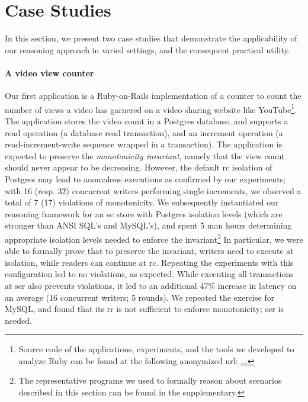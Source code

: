 \section{Case Studies}
\label{sec:case-studies}

In this section, we present two case studies that demonstrate the
applicability of our reasoning approach in varied settings, and the
consequent practical utility.

\paragraph{A video view counter} Our first application is a
Ruby-on-Rails implementation of a counter to count the number of views
a video has garnered on a video-sharing website like
YouTube\footnote{Source code of the applications, experiments, and the
tools we developed to analyze Ruby can be found at the following
anonymized url: \url{...}}. The application stores the video count in
a Postgres database, and supports a read operation (a database read
transaction), and an increment operation (a read-increment-write
sequence wrapped in a transaction). The application is expected to
preserve the \emph{monotonicity invariant}, namely that the view count
should never appear to be decreasing. However, the default {\sc rc}
isolation of Postgres may lead to anomalous executions as confirmed by
our experiments; with 16 (resp.  32) concurrent writers performing
single increments, we observed a total of 7 (17) violations of
monotonicity. We subsequently instantiated our reasoning framework for
an {\sc sc} store with Postgres isolation levels (which are stronger
than ANSI SQL's and MySQL's), and spent 5 man hours determining
appropriate isolation levels needed to enforce the
invariant\footnote{The representative \txnimp programs we used to
formally reason about scenarios described in this section can be found
in the supplementary.} In particular, we were able to formally prove
that to preserve the invariant, writers need to execute at
 isolation, while readers can continue at {\sc
rc}. Repeating the experiments with this configuration led to no
violations, as expected. While executing all transactions at {\sc ser}
also prevents violations, it led to an additional 47\% increase in
latency on an average (16 concurrent writers; 5 rounds). We repeated
the exercise for MySQL, and found that its {\sc rr} is not sufficient
to enforce monotonicity; {\sc ser} is needed. 

